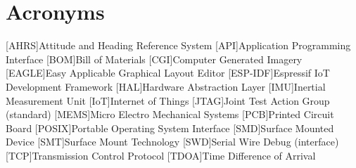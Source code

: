 \chapter{Acronyms}

\begin{acronym}

[AHRS]{Attitude and Heading Reference System}
[API]{Application Programming Interface}
[BOM]{Bill of Materials}
[CGI]{Computer Generated Imagery}
[EAGLE]{Easy Applicable Graphical Layout Editor}
[ESP-IDF]{Espressif IoT Development Framework}
[HAL]{Hardware Abstraction Layer}
[IMU]{Inertial Measurement Unit}
[IoT]{Internet of Things}
[JTAG]{Joint Test Action Group (standard)}
[MEMS]{Micro Electro Mechanical Systems}
[PCB]{Printed Circuit Board}
[POSIX]{Portable Operating System Interface}
[SMD]{Surface Mounted Device}
[SMT]{Surface Mount Technology}
[SWD]{Serial Wire Debug (interface)}
[TCP]{Transmission Control Protocol}
[TDOA]{Time Difference of Arrival}

\end{acronym}
